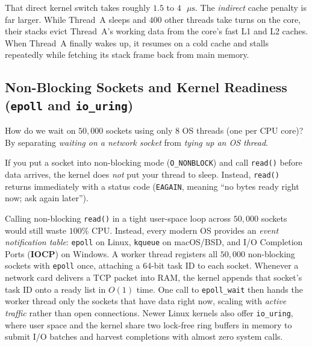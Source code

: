 That direct kernel switch takes roughly $1.5$ to $4\text{ }\mu\text{s}$. The \emph{indirect} cache penalty is far larger. While Thread~A sleeps and $400$ other threads take turns on the core, their stacks evict Thread~A's working data from the core's fast L1 and L2 caches. When Thread~A finally wakes up, it resumes on a cold cache and stalls repeatedly while fetching its stack frame back from main memory.

\subsection{Non-Blocking Sockets and Kernel Readiness (\texttt{epoll} and \texttt{io\_uring})}

How do we wait on $50{,}000$ sockets using only $8$ OS threads (one per CPU core)? By separating \emph{waiting on a network socket} from \emph{tying up an OS thread}.

If you put a socket into non-blocking mode (\texttt{O\_NONBLOCK}) and call \texttt{read()} before data arrives, the kernel does \emph{not} put your thread to sleep. Instead, \texttt{read()} returns immediately with a status code (\texttt{EAGAIN}, meaning ``no bytes ready right now; ask again later'').

Calling non-blocking \texttt{read()} in a tight user-space loop across $50{,}000$ sockets would still waste $100\%$ CPU. Instead, every modern OS provides an \emph{event notification table}: \texttt{epoll} on Linux, \texttt{kqueue} on macOS/BSD, and I/O Completion Ports (\textbf{IOCP}) on Windows. A worker thread registers all $50{,}000$ non-blocking sockets with \texttt{epoll} once, attaching a 64-bit task ID to each socket. Whenever a network card delivers a TCP packet into RAM, the kernel appends that socket's task ID onto a ready list in $O(1)$ time. One call to \texttt{epoll\_wait} then hands the worker thread only the sockets that have data right now, scaling with \emph{active traffic} rather than open connections. Newer Linux kernels also offer \texttt{io\_uring}, where user space and the kernel share two lock-free ring buffers in memory to submit I/O batches and harvest completions with almost zero system calls.

